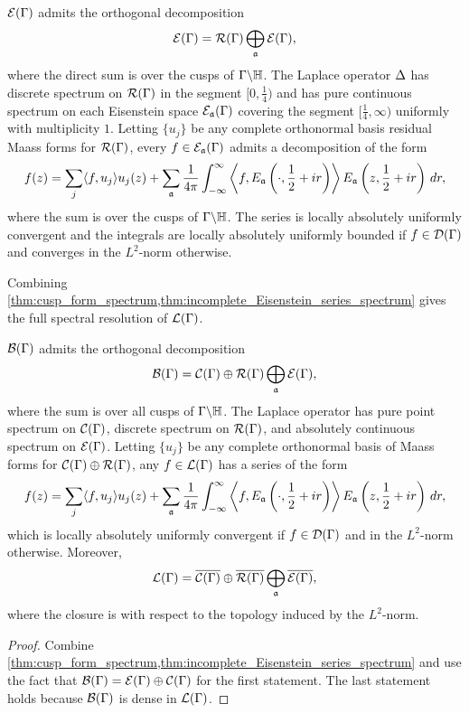       \begin{theorem}\label{thm:incomplete_Eisenstein_series_spectrum}
        $\mathcal{E}(\Gamma)$ admits the orthogonal decomposition
        \[
          \mathcal{E}(\Gamma) = \mathcal{R}(\Gamma) \bigoplus_{\mathfrak{a}}\mathcal{E}(\Gamma),
        \]
        where the direct sum is over the cusps of $\Gamma\backslash\mathbb{H}$. The Laplace operator $\Delta$ has discrete spectrum on $\mathcal{R}(\Gamma)$ in the segment $[0,\frac{1}{4})$ and has pure continuous spectrum on each Eisenstein space $\mathcal{E}_{\mathfrak{a}}(\Gamma)$ covering the segment $\big[\frac{1}{4},\infty\big)$ uniformly with multiplicity $1$. Letting $\{u_{j}\}$ be any complete orthonormal basis residual Maass forms for $\mathcal{R}(\Gamma)$, every $f \in \mathcal{E}_{\mathfrak{a}}(\Gamma)$ admits a decomposition of the form
        \[
          f(z) = \sum_{j}\langle f,u_{j}\rangle u_{j}(z)+\sum_{\mathfrak{a}}\frac{1}{4\pi}\int_{-\infty}^{\infty}\left\langle f,E_{\mathfrak{a}}\left(\cdot,\frac{1}{2}+ir\right)\right\rangle E_{\mathfrak{a}}\left(z,\frac{1}{2}+ir\right)\,dr,
        \]
        where the sum is over the cusps of $\Gamma\backslash\mathbb{H}$. The series is locally absolutely uniformly convergent and the integrals are locally absolutely uniformly bounded if $f \in \mathcal{D}(\Gamma)$ and converges in the $L^{2}$-norm otherwise.
      \end{theorem}

      Combining \cref{thm:cusp_form_spectrum,thm:incomplete_Eisenstein_series_spectrum} gives the full spectral resolution of $\mathcal{L}(\Gamma)$.

      \begin{theorem}\label{thm:the_full_spectral_resolution}
        $\mathcal{B}(\Gamma)$ admits the orthogonal decomposition
        \[
          \mathcal{B}(\Gamma) = \mathcal{C}(\Gamma) \oplus \mathcal{R}(\Gamma) \bigoplus_{\mathfrak{a}}\mathcal{E}(\Gamma),
        \]
        where the sum is over all cusps of $\Gamma\backslash\mathbb{H}$. The Laplace operator has pure point spectrum on $\mathcal{C}(\Gamma)$, discrete spectrum on $\mathcal{R}(\Gamma)$, and absolutely continuous spectrum on $\mathcal{E}(\Gamma)$. Letting $\{u_{j}\}$ be any complete orthonormal basis of Maass forms for $\mathcal{C}(\Gamma) \oplus \mathcal{R}(\Gamma)$, any $f \in \mathcal{L}(\Gamma)$ has a series of the form
        \[
          f(z) = \sum_{j}\langle f,u_{j}\rangle u_{j}(z)+\sum_{\mathfrak{a}}\frac{1}{4\pi}\int_{-\infty}^{\infty}\left\langle f,E_{\mathfrak{a}}\left(\cdot,\frac{1}{2}+ir\right)\right\rangle E_{\mathfrak{a}}\left(z,\frac{1}{2}+ir\right)\,dr,
        \]
        which is locally absolutely uniformly convergent if $f \in \mathcal{D}(\Gamma)$ and in the $L^{2}$-norm otherwise. Moreover,
        \[
          \mathcal{L}(\Gamma) = \overline{\mathcal{C}(\Gamma)} \oplus  \overline{\mathcal{R}(\Gamma)} \bigoplus_{\mathfrak{a}}\overline{\mathcal{E}(\Gamma)},
        \]
        where the closure is with respect to the topology induced by the $L^{2}$-norm.
      \end{theorem}
      \begin{proof}
        Combine \cref{thm:cusp_form_spectrum,thm:incomplete_Eisenstein_series_spectrum} and use the fact that $\mathcal{B}(\Gamma) = \mathcal{E}(\Gamma) \oplus \mathcal{C}(\Gamma)$ for the first statement. The last statement holds because $\mathcal{B}(\Gamma)$ is dense in $\mathcal{L}(\Gamma)$.
      \end{proof}
